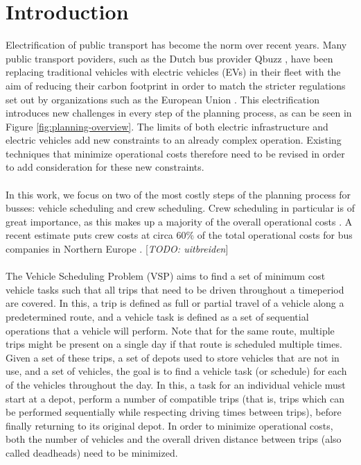 \documentclass[]{article}
\newcommand{\todo}[1]{{\color{red}[\textit{TODO: #1}]}}
\begin{document}
\section{Introduction}
Electrification  of public transport has become the norm over recent years. Many public transport poviders, such as the Dutch bus provider Qbuzz \cite{qbuzzQbuzz}, have been replacing traditional vehicles with electric vehicles (EVs) in their fleet with the aim of reducing their carbon footprint in order to match the stricter regulations set out by organizations such as the European Union \cite{europaRegulation20181999}. This electrification introduces new challenges in every step of the planning process, as can be seen in Figure \ref{fig:planning-overview}. The limits of both electric infrastructure and electric vehicles add new constraints to an already complex operation. Existing techniques that minimize operational costs therefore need to be revised in order to add consideration for these new constraints. \\\\
In this work, we focus on two of the most costly steps of the planning process for busses: vehicle scheduling and crew scheduling. Crew scheduling in particular is of great importance, as this makes up a majority of the overall operational costs \cite{BODIN198363}. A recent estimate puts crew costs at circa $60\%$ of the total operational costs for bus companies in Northern Europe \cite{PERUMAL2019280}. \todo{uitbreiden} \\\\
The Vehicle Scheduling Problem (VSP) aims to find a set of minimum cost vehicle tasks such that all trips that need to be driven throughout a timeperiod are covered. In this, a trip is defined as full or partial travel of a vehicle along a predetermined route, and a vehicle task is defined as a set of sequential operations that a vehicle will perform. Note that for the same route, multiple trips might be present on a single day if that route is scheduled multiple times. \\
Given a set of these trips, a set of depots used to store vehicles that are not in use, and a set of vehicles, the goal is to find a vehicle task (or schedule) for each of the vehicles throughout the day. In this, a task for an individual vehicle must start at a depot, perform a number of compatible trips (that is, trips which can be performed sequentially while respecting driving times between trips), before finally returning to its original depot. In order to minimize operational costs, both the number of vehicles and the overall driven distance between trips (also called deadheads) need to be minimized. \\
\end{document}
